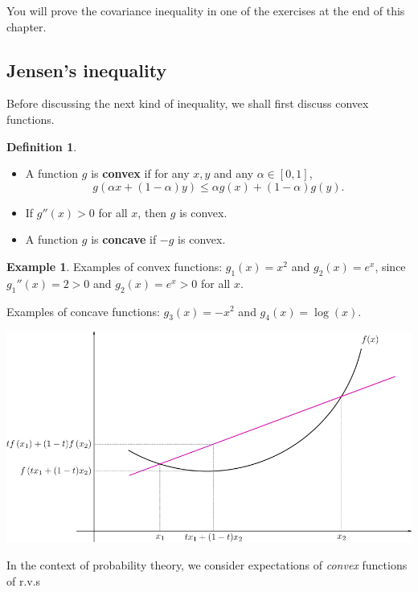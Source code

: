 \documentclass[
]{book}
\theoremstyle{definition}
\newtheorem{definition}{Definition}[chapter]
\theoremstyle{definition}
\newtheorem{example}{Example}[chapter]
\theoremstyle{definition}
\theoremstyle{definition}
\theoremstyle{remark}
\begin{document}
You will prove the covariance inequality in one of the exercises at the end of this chapter.

\hypertarget{jensens-inequality}{%
\subsection{Jensen's inequality}\label{jensens-inequality}}

Before discussing the next kind of inequality, we shall first discuss convex functions.

\begin{definition}

\begin{itemize}
\item
  A function \(g\) is \textbf{convex} if for any \(x,y\) and any
  \(\alpha \in [0,1]\),
  \[g(\alpha x + (1-\alpha)y) \leq \alpha g(x) + (1-\alpha)g(y).\]
\item
  If \(g''(x)>0\) for all \(x\), then \(g\) is convex.
\item
  A function \(g\) is \textbf{concave} if \(-g\) is convex.
\end{itemize}

\end{definition}

\begin{example}
Examples of convex functions: \(g_1(x) = x^2\) and \(g_2(x) = e^x\), since
\(g_1''(x) = 2>0\) and \(g_2(x)=e^x > 0\) for all \(x\).

Examples of concave functions: \(g_3(x) = -x^2\) and \(g_4(x) = \log(x)\).
\end{example}

\begin{center}\includegraphics[width=0.8\linewidth]{figure/01-jensen} \end{center}

In the context of probability theory, we consider expectations of \emph{convex} functions of r.v.s
\end{document}
